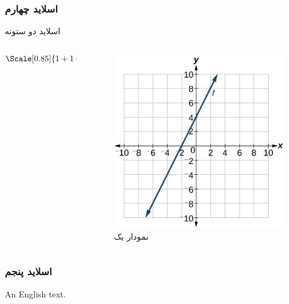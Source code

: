 \begin{frame}
\frametitle{اسلاید چهارم}
اسلاید دو ستونه
\begin{columns}[T] 
\begin{column}{.48\textwidth}
\vspace{30pt}
\begin{equation*}
\Scale[0.85]{ %
\begin{aligned}
1+1=2
\end{aligned}
}
\end{equation*}
\end{column}
\hfill
\begin{column}{.48\textwidth}
\begin{figure}
\centering
\includegraphics[width=1\linewidth]{assets/plot.jpg}
\caption{نمودار یک}
\end{figure}
\end{column}
\end{columns}
\end{frame}



\begin{frame}
\frametitle{اسلاید پنجم}

{
An English text.
}
\end{frame}


